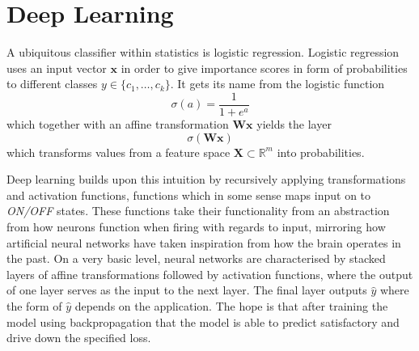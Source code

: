 

\section{Deep Learning}
A ubiquitous classifier within statistics is logistic regression. Logistic
regression uses an input vector $\bm{x}$ in order to give importance scores in
form of probabilities to different classes $y \in \{c_1, \dots, c_k\}$. It gets
its name from the logistic function
\begin{equation}
  \label{eq:logistic_function}
  \sigma(a) = \frac{1}{1 + e^{a}}
\end{equation}
which together with an affine transformation $\bm{W} \bm{x}$ yields the layer
\begin{equation*}
  \sigma(\bm{W} \bm{x})
\end{equation*}
which transforms values from a feature space $\bm{X} \subset \mathbb{R}^m$ into
probabilities\cite{Bishop:2006}.

Deep learning builds upon this intuition by recursively applying transformations
and activation functions, functions which in some sense maps input on to
\textit{ON/OFF} states. These functions take their functionality from an
abstraction from how neurons function when firing with regards to input,
mirroring how artificial neural networks have taken inspiration from how the
brain operates in the past. On a very basic level, neural networks are
characterised by stacked layers of affine transformations followed by activation
functions, where the output of one layer serves as the input to the next layer.
The final layer outputs $\hat{y}$ where the form of $\hat{y}$ depends on the application.
The hope is that after training the model using
backpropagation\cite{Rumelhart:1995:BBT:201784.201785} that the model is able to
predict satisfactory and drive down the specified loss.


